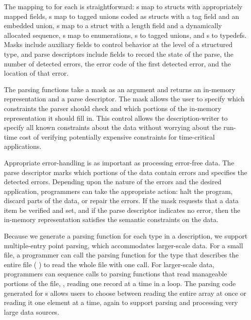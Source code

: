 The mapping to \C{} for each is straightforward: s map to
\C{} structs with appropriately mapped fields, s map to
tagged unions coded as \C{} structs with a tag field and an embedded
union, s map to a \C{} struct with a length field and a
dynamically allocated sequence, s map to \C{} enumerations,
s to tagged unions, and s to \C{} typedefs.
Masks include auxiliary fields to control behavior at the level of a
structured type, and parse descriptors include fields to record the
state of the parse, the number of detected errors, the error code of
the first detected error, and the location of that error.

The parsing functions take a mask as an argument and returns an
in-memory representation and a parse descriptor.  
The mask allows the user to specify 
which constraints the parser should check and which portions of the
in-memory representation it should fill in.  This control allows the
description-writer to specify all known constraints about the data
without worrying about the run-time cost of verifying potentially
expensive constraints for time-critical applications.

Appropriate error-handling is as important as processing error-free
data.  The parse descriptor marks which portions of the data contain
errors and specifies the detected errors.  Depending upon the nature
of the errors and the desired application, programmers can take the
appropriate action: halt the program, discard parts of the data, or
repair the errors.  If the mask requests that a data item be verified
and set, and if the parse descriptor indicates no error, then the
in-memory representation satisfies the semantic constraints on the
data.

Because we generate a parsing function for each type in a \pads{}
description, we support multiple-entry point parsing, which
accommodates larger-scale data.  For a small file, a programmer can
call the parsing function for the \pads{} type that describes the
entire file (\eg{} ) to read the whole file with
one call.  For larger-scale data, programmers can sequence calls to
parsing functions that read manageable portions of the file, \eg{},
reading one record at a time in a loop.  The parsing code generated for
s allows users to choose between reading the entire array
at once or reading it one element at a time, again to support parsing
and processing very large data sources.  


 